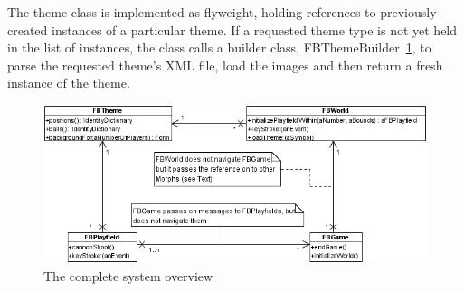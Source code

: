 The theme class is implemented as flyweight, holding references to previously 
created instances of a particular theme. If a requested theme type is not yet 
held in the list of instances, the class calls a builder class, 
FBThemeBuilder~\ref{fig:system}, to parse the requested theme's XML file, 
load the images and then return a fresh instance of the theme.
%
\begin{figure}[tbh]
  \begin{center}
    \includegraphics{images/architecture.png}
  \end{center}
  \caption{The complete system overview}
  \label{fig:system}
\end{figure}
%

